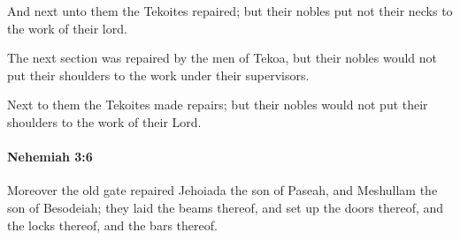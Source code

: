 			\begin{versebox}
					\item[BHS] 
					\item[LXX] 
					\item[ASV] And next unto them the Tekoites repaired; but their nobles put not their necks to the work of their lord.
					\item[NIV] The next section was repaired by the men of Tekoa, but their nobles would not put their shoulders to the work under their supervisors.
					\item[NRSV] Next to them the Tekoites made repairs; but their nobles would not put their shoulders to the work of their Lord.
			\end{versebox}

		\paragraph{Nehemiah 3:6} %
			\label{NEHEMIAH-3-6}

			Moreover the old gate repaired Jehoiada the son of Paseah, and Meshullam the son of Besodeiah; they laid the beams thereof, and set up the doors thereof, and the locks thereof, and the bars thereof.

